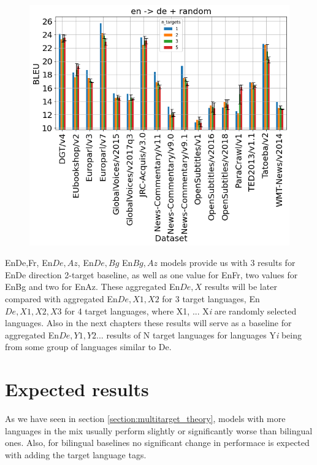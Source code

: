 \begin{figure}[h]
	\centering
	\includegraphics[width=1.0\columnwidth]{../img/random_en_de.png}
	\label{fig:random_en_de}
\end{figure}

En\to{}De,Fr, En\to{}${De,Az}$, En\to{}${De,Bg}$ En\to{}${Bg,Az}$ models
provide us with 3 results for En\to{}De direction 2-target baseline, as well
as one value for En\to{}Fr, two values for En\to{}Bg and two for En\to{}Az.
These aggregated En\to{}${De,X}$ results will be later compared with
aggregated En\to{}${De,X1,X2}$ for 3 target languages,
En\to{}${De,X1,X2,X3}$ for 4 target languages, where X1, ... X\textit{i} are
randomly selected languages.
Also in the next chapters these results will serve as a baseline for
aggregated En\to{}${De,Y1,Y2...}$ results of N target languages for languages
Y\textit{i} being from some group of languages similar to De.


\section{Expected results}

As we have seen in section \ref{section:multitarget_theory}, models with more languages
in the mix usually perform slightly or significantly worse than bilingual ones.
Also, for bilingual baselines no significant change in performace is expected with adding
the target language tags.

